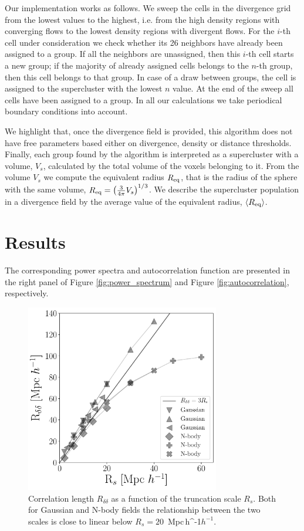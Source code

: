 \documentclass[usenatbib]{mnras}
\newcommand{\Mpch}{\,{\rm Mpc}\,\ifmmode h^{-1}\else $h^{-1}$\fi}
\begin{document}
Our implementation works as follows. 
We sweep the cells in the divergence grid from the lowest values to the highest, i.e. from the high density regions with converging flows to the lowest density regions with divergent flows.
For the $i$-th cell under consideration we check whether its 26 neighbors have already been assigned to a group. 
If all the neighbors are unassigned, then this $i$-th cell starts a new group; if the majority of already assigned cells belongs to the $n$-th group, then this cell belongs to that group.
In case of a draw between groups, the cell is assigned to the supercluster with the lowest $n$ value.
At the end of the sweep all cells have been assigned to a group. 
In all our calculations we take periodical boundary conditions into account.  

We highlight that, once the divergence field is provided, this algorithm
does not have free parameters based either on divergence, density or distance thresholds. 
Finally, each group found by the algorithm is interpreted as a supercluster 
with a volume, $V_s$, calculated by the total volume of the voxels belonging to it.
From the volume $V_s$ we compute the equivalent radius $R_{\rm eq}$, that is the radius of the sphere with the same volume, 
   $ R_{\rm eq} = \left(\frac{3}{4\pi}V_{s}\right)^{1/3}$.
We describe the supercluster population in a divergence field by the average value of the equivalent radius, $\langle R_{\rm eq}\rangle$.


\section{Results}


The corresponding power spectra and autocorrelation function are presented in the right panel of Figure \ref{fig:power_spectrum}
 and Figure \ref{fig:autocorrelation}, respectively.
 
 
 

\begin{figure}
    \centering
    \includegraphics[width=240pt]{correlation_length.pdf}
    \caption{Correlation length $R_{\delta\delta}$ as a function of the truncation scale $R_s$.
    Both for Gaussian and N-body fields the relationship between the two scales is close to linear below $R_{s}=20$ \Mpch.}
    \label{fig:correlation length}
\end{figure}
\end{document}
